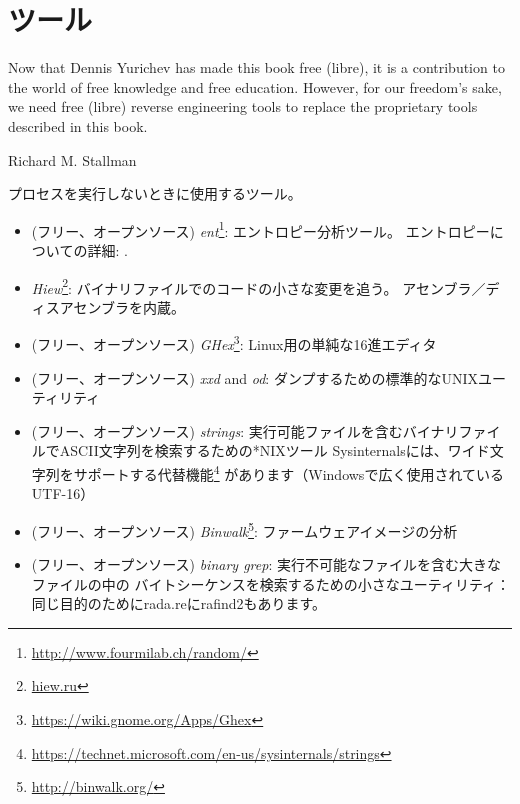 \chapter{ツール}

\epigraph{Now that Dennis Yurichev has made this book free (libre), it is a
contribution to the world of free knowledge and free education.
However, for our freedom's sake, we need free (libre) reverse
engineering tools to replace the proprietary tools described in this book.}{Richard M. Stallman}


プロセスを実行しないときに使用するツール。


\begin{itemize}
\item
(フリー、オープンソース) \emph{ent}\footnote{\url{http://www.fourmilab.ch/random/}}: エントロピー分析ツール。
エントロピーについての詳細: .

\item
\label{Hiew}
\emph{Hiew}\footnote{\href{http://go.yurichev.com/17035}{hiew.ru}}:
バイナリファイルでのコードの小さな変更を追う。
アセンブラ／ディスアセンブラを内蔵。

\item (フリー、オープンソース) \emph{GHex}\footnote{\url{https://wiki.gnome.org/Apps/Ghex}}: Linux用の単純な16進エディタ

\item (フリー、オープンソース) \emph{xxd} and \emph{od}: ダンプするための標準的なUNIXユーティリティ

\item (フリー、オープンソース) \emph{strings}: 実行可能ファイルを含むバイナリファイルでASCII文字列を検索するための*NIXツール
Sysinternalsには、ワイド文字列をサポートする代替機能\footnote{\url{https://technet.microsoft.com/en-us/sysinternals/strings}}
があります（Windowsで広く使用されているUTF-16）

\item (フリー、オープンソース) \emph{Binwalk}\footnote{\url{http://binwalk.org/}}: ファームウェアイメージの分析

\item
{}
(フリー、オープンソース) \emph{binary grep}:
実行不可能なファイルを含む大きなファイルの中の
バイトシーケンスを検索するための小さなユーティリティ：\BGREPURL
{}
同じ目的のためにrada.reにrafind2もあります。
\end{itemize}

